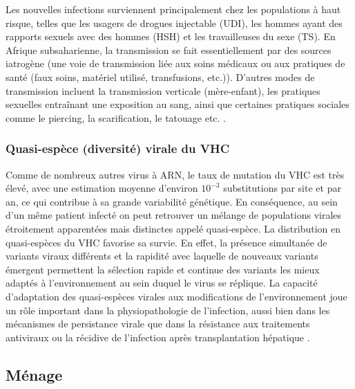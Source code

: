 \documentclass[a4paper,12pt]{article}
\begin{document}
 
 Les nouvelles infections surviennent principalement chez les populations à haut risque, telles que les usagers de drogues injectable (UDI), les hommes ayant des rapports sexuels avec des hommes (HSH) et les travailleuses du sexe (TS). En Afrique subsaharienne, la transmission se fait essentiellement par des sources iatrogène (une voie de transmission liée aux soins médicaux ou aux pratiques de santé (faux soins, matériel utilisé, transfusions, etc.)). D'autres modes de transmission incluent la transmission verticale (mère-enfant), les pratiques sexuelles entraînant une exposition au sang, ainsi que certaines pratiques sociales comme le piercing, la scarification, le tatouage etc. \cite{ouobaEpidemiologicProfileHepatitis2021, Hepatitisb}.
 
 
 \subsubsection  {Quasi-espèce (diversité) virale du VHC}
  
Comme de nombreux autres virus à ARN, le taux de mutation du VHC est très élevé, avec une estimation  moyenne d'environ $10^{-3}$ substitutions par site et par an, ce qui contribue à sa grande variabilité génétique.  En conséquence, au sein d’un même patient infecté on peut retrouver un mélange de populations virales étroitement apparentées mais distinctes appelé quasi-espèce. La distribution en quasi-espèces du VHC favorise sa survie. En effet, la présence simultanée de variants viraux différents et la rapidité avec laquelle de nouveaux variants émergent permettent la sélection rapide et continue des variants les mieux adaptés à l’environnement au sein duquel le virus se réplique. La capacité d’adaptation des quasi-espèces virales aux modifications de l’environnement joue un rôle important dans la physiopathologie de l’infection, aussi bien dans les mécanismes de persistance virale que dans la résistance aux traitements antiviraux ou la récidive de l’infection après transplantation hépatique \cite{pawlotskyVirusLhepatite2002,mennecierVirusLhepatiteMonhepatogastro2022}.


\subsection{Ménage}
\end{document}
